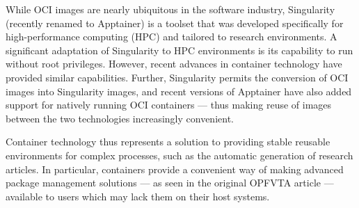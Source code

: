 While OCI images are nearly ubiquitous in the software industry, Singularity (recently renamed to Apptainer) is a toolset that was developed specifically for high-performance computing (HPC) and tailored to research environments.
A significant adaptation of Singularity to HPC environments is its capability to run without root privileges.
However, recent advances in container technology have provided similar capabilities.
Further, Singularity permits the conversion of OCI images into Singularity images, and recent versions of Apptainer have also added support for natively running OCI containers — thus making reuse of images between the two technologies increasingly convenient.

Container technology thus represents a solution to providing stable reusable environments for complex processes, such as the automatic generation of research articles.
In particular, containers provide a convenient way of making advanced package management solutions — as seen in the original OPFVTA article — available to users which may lack them on their host systems.
